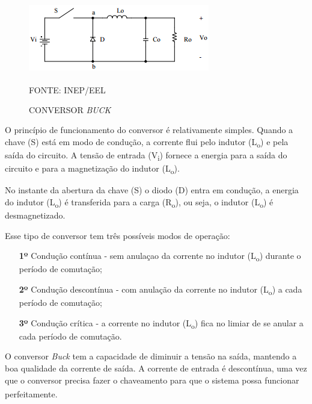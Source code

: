 \documentclass[
	12pt,				%
	openright,			%
	oneside,			%
	a4paper,			%
	english,			%
	french,				%
	spanish,			%
	brazil,				%
	oldfontcommands
	]{abntex2}
\begin{document}
 	\begin{figure}[th]
		\caption{CONVERSOR \textit{BUCK}}
		\label{Fig_buck}
		\centering
		\includegraphics[width=0.75\linewidth]{./figs/buck}
			
		\begin{small}
			FONTE: INEP/EEL\textsuperscript{\cite{inep}}
		\end{small}		
	\end{figure}

	O princípio de funcionamento do conversor é relativamente simples. Quando a chave (S) está em modo de condução, a corrente flui pelo indutor (L\textsubscript{o}) e pela saída do circuito. A tensão de entrada (V\textsubscript{i}) fornece a energia para a saída do circuito e para a magnetização do indutor (L\textsubscript{o}).
	
	No instante da abertura da chave (S) o diodo (D) entra em condução, a energia do indutor (L\textsubscript{o}) é transferida para a carga (R\textsubscript{o}), ou seja, o indutor (L\textsubscript{o}) é desmagnetizado.
	
	Esse tipo de conversor tem três possíveis modos de operação:
	
	\begin{itemize} 
		\item[\textbf{1º}] Condução contínua - sem anulaçao da corrente no indutor (L\textsubscript{o}) durante o período de comutação;
		\item[\textbf{2º}] Condução descontínua - com anulação da corrente no indutor (L\textsubscript{o}) a cada período de comutação;
		\item[\textbf{3º}] Condução crítica - a corrente no indutor (L\textsubscript{o}) fica no limiar de se anular a cada período de comutação.
	\end{itemize}
	
	O conversor \textit{Buck} tem a capacidade de diminuir a tensão na saída, mantendo a boa qualidade da corrente de saída. A corrente de entrada é descontínua, uma vez que o conversor precisa fazer o chaveamento para que o sistema possa funcionar perfeitamente.\textsuperscript{\cite{inep}}
	
\end{document}
